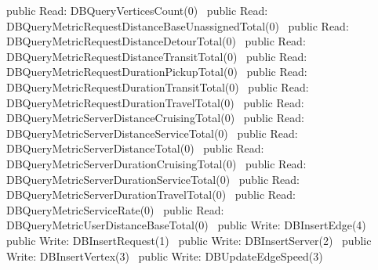 public \LA{}Read: DBQueryVerticesCount(0)~{\nwtagstyle{}}\RA{}
\nwendcode{}\nwdocspar
{}
\nwenddocs{}\plusendmoddef
public \LA{}Read: DBQueryMetricRequestDistanceBaseUnassignedTotal(0)~{\nwtagstyle{}}\RA{}
public \LA{}Read: DBQueryMetricRequestDistanceDetourTotal(0)~{\nwtagstyle{}}\RA{}
public \LA{}Read: DBQueryMetricRequestDistanceTransitTotal(0)~{\nwtagstyle{}}\RA{}
public \LA{}Read: DBQueryMetricRequestDurationPickupTotal(0)~{\nwtagstyle{}}\RA{}
public \LA{}Read: DBQueryMetricRequestDurationTransitTotal(0)~{\nwtagstyle{}}\RA{}
public \LA{}Read: DBQueryMetricRequestDurationTravelTotal(0)~{\nwtagstyle{}}\RA{}
public \LA{}Read: DBQueryMetricServerDistanceCruisingTotal(0)~{\nwtagstyle{}}\RA{}
public \LA{}Read: DBQueryMetricServerDistanceServiceTotal(0)~{\nwtagstyle{}}\RA{}
public \LA{}Read: DBQueryMetricServerDistanceTotal(0)~{\nwtagstyle{}}\RA{}
public \LA{}Read: DBQueryMetricServerDurationCruisingTotal(0)~{\nwtagstyle{}}\RA{}
public \LA{}Read: DBQueryMetricServerDurationServiceTotal(0)~{\nwtagstyle{}}\RA{}
public \LA{}Read: DBQueryMetricServerDurationTravelTotal(0)~{\nwtagstyle{}}\RA{}
public \LA{}Read: DBQueryMetricServiceRate(0)~{\nwtagstyle{}}\RA{}
public \LA{}Read: DBQueryMetricUserDistanceBaseTotal(0)~{\nwtagstyle{}}\RA{}
\nwendcode{}\nwdocspar
{}
\nwenddocs{}\plusendmoddef
public \LA{}Write: DBInsertEdge(4)~{\nwtagstyle{}}\RA{}
public \LA{}Write: DBInsertRequest(1)~{\nwtagstyle{}}\RA{}
public \LA{}Write: DBInsertServer(2)~{\nwtagstyle{}}\RA{}
public \LA{}Write: DBInsertVertex(3)~{\nwtagstyle{}}\RA{}
public \LA{}Write: DBUpdateEdgeSpeed(3)~{\nwtagstyle{}}\RA{}
